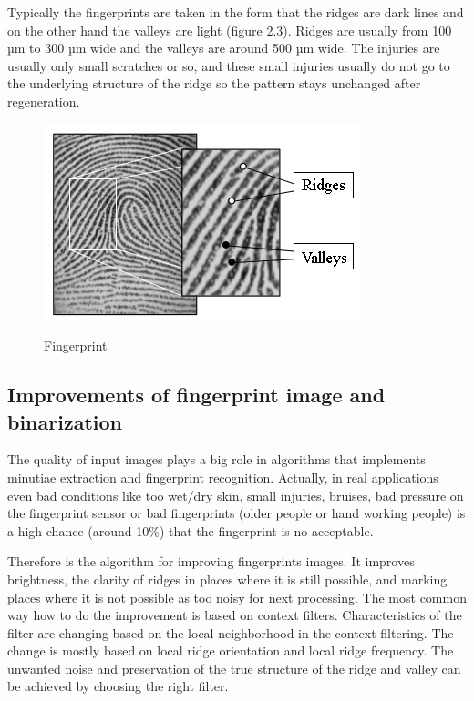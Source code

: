 Typically the fingerprints are taken in the form that the ridges are dark lines and on the other hand the valleys are light (figure 2.3). Ridges are usually from 100 µm to 300 µm wide and the valleys are around 500 µm wide. The injuries are usually only small scratches or so, and these small injuries usually do not go to the underlying structure of the ridge so the pattern stays unchanged after regeneration. \cite{maltoni2009handbook}

\begin{figure}[H]
    \centering
        {\includegraphics[width=0.5\linewidth]{obrazky-figures/print.png}}\\
        \caption{Fingerprint \cite{maltoni2009handbook}}
        \label{fig:fingerprint_1}
\end{figure}

\subsection{Improvements of fingerprint image and binarization}
The quality of input images plays a big role in algorithms that implements minutiae extraction and fingerprint recognition. Actually, in real applications even bad conditions like too wet/dry skin, small injuries, bruises, bad pressure on the fingerprint sensor or bad fingerprints (older people or hand working people) is a high chance (around 10$\%$) that the fingerprint is no acceptable.\cite{jain2007handbook}

Therefore is the algorithm for improving fingerprints images. It improves brightness, the clarity of ridges in places where it is still possible, and marking places where it is not possible as too noisy for next processing. The most common way how to do the improvement is based on context filters. Characteristics of the filter are changing based on the local neighborhood in the context filtering. The change is mostly based on local ridge orientation and local ridge frequency. The unwanted noise and preservation of the true structure of the ridge and valley can be achieved by choosing the right filter.\cite{jain2007handbook} 

